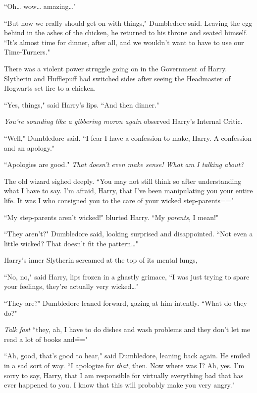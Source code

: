 ``Oh{\ldots} wow{\ldots} amazing{\ldots}"

``But now we really should get on with things," Dumbledore said. Leaving the egg behind in the ashes of the chicken, he returned to his throne and seated himself. ``It's almost time for dinner, after all, and we wouldn't want to have to use our Time-Turners."

There was a violent power struggle going on in the Government of Harry. Slytherin and Hufflepuff had switched sides after seeing the Headmaster of Hogwarts set fire to a chicken.

``Yes, things," said Harry's lips. ``And then dinner."

\emph{You're sounding like a gibbering moron again} observed Harry's Internal Critic.

``Well," Dumbledore said. ``I fear I have a confession to make, Harry. A confession and an apology."

``Apologies are good." \emph{That doesn't even make sense! What am I talking about?}

The old wizard sighed deeply. ``You may not still think so after understanding what I have to say. I'm afraid, Harry, that I've been manipulating you your entire life. It was I who consigned you to the care of your wicked step-parents\==="

``My step-parents aren't wicked!" blurted Harry. ``My \emph{parents}, I mean!"

``They aren't?" Dumbledore said, looking surprised and disappointed. ``Not even a little wicked? That doesn't fit the pattern{\ldots}"

Harry's inner Slytherin screamed at the top of its mental lungs, \emph{}

``No, no," said Harry, lips frozen in a ghastly grimace, ``I was just trying to spare your feelings, they're actually very wicked{\ldots}"

``They are?" Dumbledore leaned forward, gazing at him intently. ``What do they do?"

\emph{Talk fast} ``they, ah, I have to do dishes and wash problems and they don't let me read a lot of books and\==="

``Ah, good, that's good to hear," said Dumbledore, leaning back again. He smiled in a sad sort of way. ``I apologize for \emph{that}, then. Now where was I? Ah, yes. I'm sorry to say, Harry, that I am responsible for virtually everything bad that has ever happened to you. I know that this will probably make you very angry."

